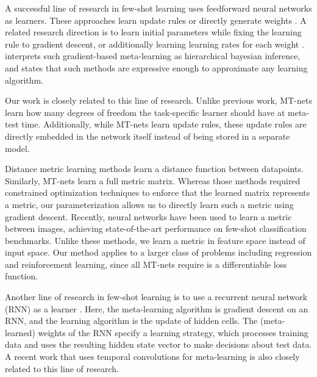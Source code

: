 \documentclass{article}
\begin{document}
A successful line of research in few-shot learning uses feedforward neural networks as learners.
These approaches learn update rules \cite{RaviS2017iclr, Li2016nips, Andrychowicz2016nips} or directly generate weights \cite{Ha2017iclr}.
A related research direction is to learn initial parameters \cite{FinnC2017icml} while fixing the learning rule to gradient descent,
 or additionally learning learning rates for each weight \cite{Li2017arxiv}.
\cite{Grant2018iclr} interprets such gradient-based meta-learning as hierarchical bayesian inference, and
\cite{FinnC2017arxiv} states that such methods are expressive enough to approximate any learning algorithm.

Our work is closely related to this line of research.
Unlike previous work, MT-nets learn how many degrees of freedom the task-specific learner should have at meta-test time.
Additionally, while MT-nets learn update rules, these update rules are directly embedded in the network itself instead of being stored in a separate model.

Distance metric learning \cite{XingEP2002nips, WeinbergerKQ2005nips} methods learn a distance function between datapoints.
Similarly, MT-nets learn a full metric matrix.
Whereas those methods required constrained optimization techniques to enforce that the learned matrix represents a metric,
our parameterization allows us to directly learn such a metric using gradient descent.
Recently, neural networks have been used to learn a metric between images\cite{KochG2015icml, VinyalsO2016nips, SnellJ2017nips},
achieving state-of-the-art performance on few-shot classification benchmarks.
Unlike these methods, we learn a metric in feature space instead of input space.
Our method applies to a larger class of problems including regression and reinforcement learning, since all MT-nets require is a differentiable loss function.

Another line of research in few-shot learning is to use a recurrent neural network (RNN) as a learner \cite{SantoroA2016icml, MunkhdalaiT2017icml}.
Here, the meta-learning algorithm is gradient descent on an RNN, and the learning algorithm is the update of hidden cells.
The (meta-learned) weights of the RNN specify a learning strategy, which processes training data and uses the resulting hidden state vector to make decisions about test data.
A recent work that uses temporal convolutions for meta-learning\cite{Mishra2018iclr} is also closely related to this line of research.
\end{document}
